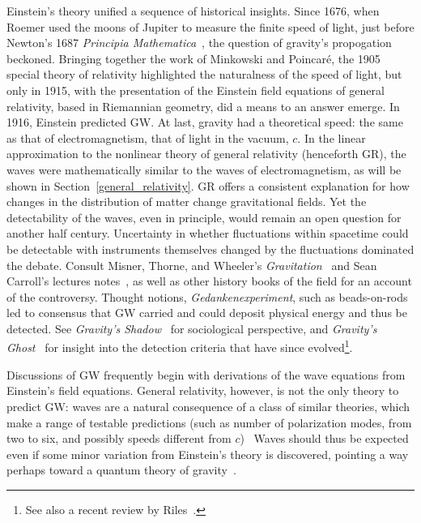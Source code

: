         Einstein's theory unified a sequence of historical insights. 
Since 1676, when Roemer used the moons of Jupiter to measure the finite speed of light, just before Newton's 1687 \textit{Principia Mathematica}~\cite{Hawking2002}, the question of gravity's propogation beckoned. 
Bringing together the work of Minkowski and Poincar\'{e}, the 1905 special theory of relativity highlighted the naturalness of the speed of light, but only in 1915, with the presentation of the Einstein field equations of general relativity, based in Riemannian geometry, did a means to an answer emerge. 
In 1916, Einstein predicted GW. 
At last, gravity had a theoretical speed: the same as that of electromagnetism, that of light in the vacuum, $c$.
In the linear approximation to the nonlinear theory of general relativity (henceforth GR), the waves were mathematically similar to the waves of electromagnetism, as will be shown in Section~\ref{general_relativity}.
GR offers a consistent explanation for how changes in the distribution of matter change gravitational fields.
Yet the detectability of the waves, even in principle, would remain an open question for another half century. 
Uncertainty in whether fluctuations within spacetime could be detectable with instruments themselves changed by the fluctuations dominated the debate.
Consult Misner, Thorne, and Wheeler's \textit{Gravitation}~\cite{MisnerThorneWheeler} and Sean Carroll's lectures notes~\cite{Carroll1997}, as well as other history books of the field for an account of the controversy.
Thought notions, \textit{Gedankenexperiment}, such as beads-on-rods led to consensus that GW carried and could deposit physical energy and thus be detected. 
See \textit{Gravity's Shadow}~\cite{CollinsGravityShadow} for sociological perspective, and 
\textit{Gravity's Ghost}~\cite{CollinsGravityGhost} for insight into the detection criteria that have since evolved\footnote{See also a recent review by Riles~\cite{Riles2013}.}.

Discussions of GW frequently begin with derivations of the wave equations from Einstein's field equations. 
General relativity, however, is not the only theory to predict GW: waves are a natural consequence of a class of similar theories, which make a range of testable predictions (such as number of polarization modes, from two to six, and possibly speeds different from $c$)~\cite{Will1993} 
Waves should thus be expected even if some minor variation from Einstein's theory is discovered, pointing a way perhaps toward a quantum theory of gravity~\cite{Sathyaprakash2009}. 

